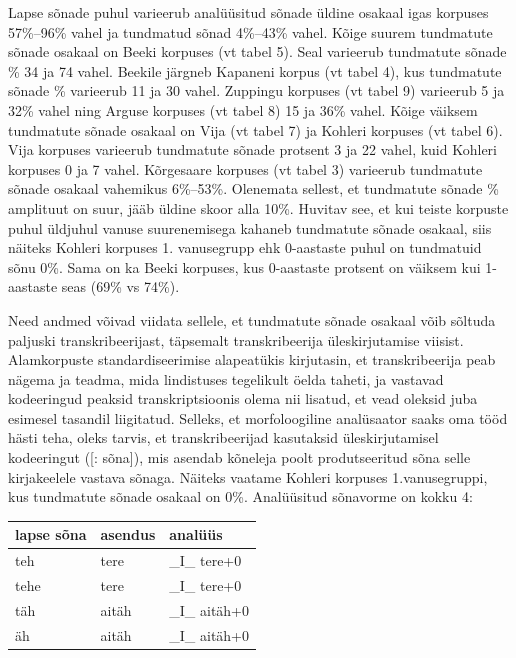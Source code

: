 \documentclass[12pt]{article}
\begin{document}
Lapse sõnade puhul varieerub analüüsitud sõnade üldine osakaal igas korpuses 57\%--96\% vahel ja tundmatud sõnad 4\%--43\% vahel. Kõige suurem tundmatute sõnade osakaal on Beeki korpuses (vt tabel 5). Seal varieerub tundmatute sõnade \% 34 ja 74 vahel. Beekile järgneb Kapaneni korpus (vt tabel 4), kus tundmatute sõnade \% varieerub 11 ja 30 vahel. Zuppingu korpuses (vt tabel 9) varieerub 5 ja 32\% vahel ning Arguse korpuses (vt tabel 8) 15 ja 36\% vahel. Kõige väiksem tundmatute sõnade osakaal on Vija (vt tabel 7) ja Kohleri korpuses (vt tabel 6). Vija korpuses varieerub tundmatute sõnade protsent 3 ja 22 vahel, kuid Kohleri korpuses 0 ja 7 vahel. Kõrgesaare korpuses (vt tabel 3) varieerub tundmatute sõnade osakaal vahemikus 6\%--53\%. Olenemata sellest, et tundmatute sõnade \% amplituut on suur, jääb üldine skoor alla 10\%. Huvitav see, et kui teiste korpuste puhul üldjuhul vanuse suurenemisega kahaneb tundmatute sõnade osakaal, siis näiteks Kohleri korpuses 1. vanusegrupp ehk 0-aastaste puhul on tundmatuid sõnu 0\%. Sama on ka Beeki korpuses, kus 0-aastaste protsent on väiksem kui 1-aastaste seas (69\% vs 74\%).

Need andmed võivad viidata sellele, et tundmatute sõnade osakaal võib sõltuda paljuski transkribeerijast, täpsemalt transkribeerija üleskirjutamise viisist. Alamkorpuste standardiseerimise alapeatükis kirjutasin, et transkribeerija peab nägema ja teadma, mida lindistuses tegelikult öelda taheti, ja vastavad kodeeringud peaksid transkriptsioonis olema nii lisatud, et vead oleksid juba esimesel tasandil liigitatud.
Selleks, et morfoloogiline analüsaator saaks oma tööd hästi teha, oleks tarvis, et transkribeerijad kasutaksid üleskirjutamisel kodeeringut ([: sõna]), mis asendab kõneleja poolt produtseeritud sõna selle kirjakeelele vastava sõnaga. Näiteks vaatame Kohleri korpuses 1.vanusegruppi, kus tundmatute sõnade osakaal on 0\%. Analüüsitud sõnavorme on kokku 4:

\begin{table}[H]
\begin{tabular}{|l|l|l|}
\hline
lapse sõna & asendus & analüüs       \\ \hline\hline
teh        & tere    & \_I\_ tere+0  \\ \hline
tehe       & tere    & \_I\_ tere+0  \\ \hline
täh        & aitäh   & \_I\_ aitäh+0 \\ \hline
äh         & aitäh   & \_I\_ aitäh+0 \\ \hline
\end{tabular}
\end{table}
\end{document}
